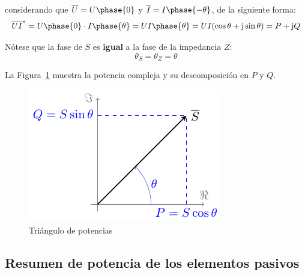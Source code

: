 \begin{itemize}
  considerando que $\overline{U} = U\phase{0}$ y
  $\overline{I} = I\phase{-\theta}$, de la siguiente forma:
  \begin{equation*}
    \overline{U} \overline{I}^* = U\phase{0} \cdot I\phase{\theta} = UI\phase{\theta}= U I (\cos\theta + \mathrm{j} \sin\theta) = P + \mathrm{j} Q
  \end{equation*}
  \begin{remark}
    Nótese que la fase de $\overline{S}$ es \textbf{igual} a la fase
    de la impedancia $\overline{Z}$:
    \begin{equation*}
      \theta_S = \theta_Z = \theta
    \end{equation*}
  \end{remark}
  La Figura~\ref{fig.trianguloPotencias} muestra la potencia compleja
  y su descomposición en $P$ y $Q$.
  \begin{figure}[H]
    \centering \includegraphics{../figs/trianguloPotencias.pdf}
    \caption{Triángulo de potencias}
    \label{fig.trianguloPotencias}
  \end{figure}
\end{itemize}
	
	
\subsection{Resumen de potencia de los elementos pasivos}
	
